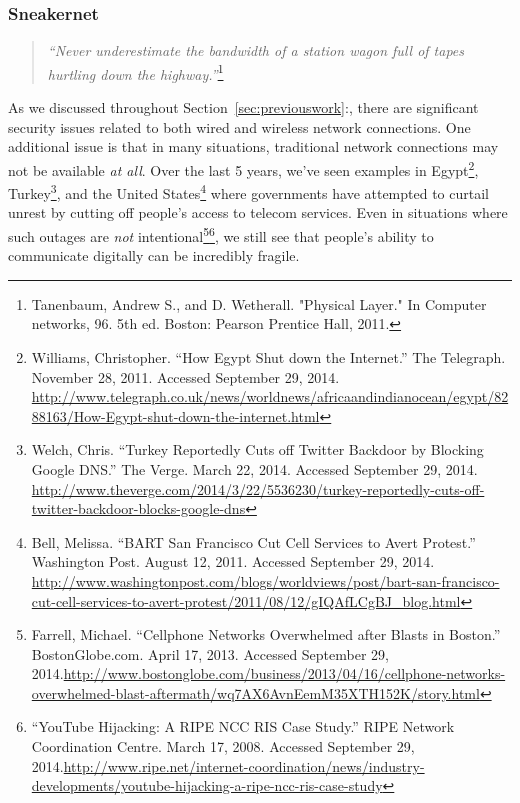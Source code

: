 \documentclass[12pt]{article}
\begin{document}
  \subsubsection{Sneakernet}
  
   \begin{quote}
    \emph{``Never underestimate the bandwidth of a station wagon full of tapes hurtling down the highway.''}\footnote{Tanenbaum, Andrew S., and D. Wetherall. "Physical Layer." In Computer networks, 96. 5th ed. Boston: Pearson Prentice Hall, 2011.}
  \end{quote}

  As we discussed throughout Section~\ref{sec:previouswork}:, there are significant security issues related to both wired and wireless network connections. One additional issue is that in many situations, traditional network connections may not be available \textit{at all}. Over the last 5 years, we've seen examples in Egypt\footnote{Williams, Christopher. ``How Egypt Shut down the Internet.'' The Telegraph. November 28, 2011. Accessed September 29, 2014. \url{http://www.telegraph.co.uk/news/worldnews/africaandindianocean/egypt/8288163/How-Egypt-shut-down-the-internet.html}}, Turkey\footnote{Welch, Chris. ``Turkey Reportedly Cuts off Twitter Backdoor by Blocking Google DNS.'' The Verge. March 22, 2014. Accessed September 29, 2014. \url{http://www.theverge.com/2014/3/22/5536230/turkey-reportedly-cuts-off-twitter-backdoor-blocks-google-dns}}, and the United States\footnote{Bell, Melissa. ``BART San Francisco Cut Cell Services to Avert Protest.'' Washington Post. August 12, 2011. Accessed September 29, 2014. \url{http://www.washingtonpost.com/blogs/worldviews/post/bart-san-francisco-cut-cell-services-to-avert-protest/2011/08/12/gIQAfLCgBJ_blog.html}} where governments have attempted to curtail unrest by cutting off people's access to telecom services. Even in situations where such outages are \textit{not} intentional\footnote{Farrell, Michael. ``Cellphone Networks Overwhelmed after Blasts in Boston.'' BostonGlobe.com. April 17, 2013. Accessed September 29, 2014.\url{http://www.bostonglobe.com/business/2013/04/16/cellphone-networks-overwhelmed-blast-aftermath/wq7AX6AvnEemM35XTH152K/story.html}}\footnote{``YouTube Hijacking: A RIPE NCC RIS Case Study.'' RIPE Network Coordination Centre. March 17, 2008. Accessed September 29, 2014.\url{http://www.ripe.net/internet-coordination/news/industry-developments/youtube-hijacking-a-ripe-ncc-ris-case-study}}, we still see that people's ability to communicate digitally can be incredibly fragile.
  
\end{document}
